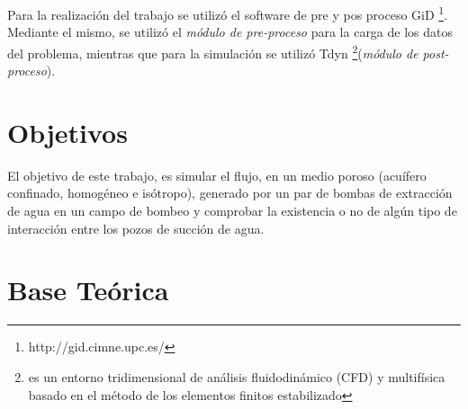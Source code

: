 \documentclass[10pt,a4paper,final]{article}
\begin{document}
Para la realización del trabajo se utilizó el software de pre y pos proceso GiD \footnote{http://gid.cimne.upc.es/}. Mediante el mismo, se utilizó el \emph{módulo de pre-proceso} para la carga de los datos del problema, mientras que para la simulación se utilizó Tdyn \footnote{es un entorno tridimensional de análisis fluidodinámico (CFD) y multifísica basado en el método de los elementos finitos estabilizado}(\emph{módulo de post-proceso}).
\section{Objetivos}
El objetivo de este trabajo, es simular el flujo, en un medio poroso (acuífero confinado, homogéneo e isótropo), generado por un par de bombas de extracción de agua en un campo de bombeo y comprobar la existencia o no de algún tipo de interacción entre los pozos de succión de agua. 
\section{Base Teórica}
\end{document}
